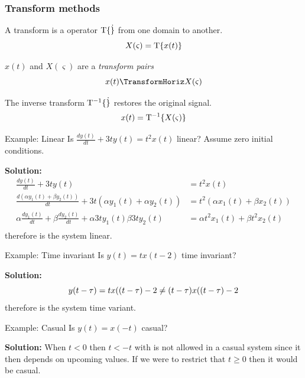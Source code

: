 \documentclass{article}
\begin{document}
\subsubsection{Transform methods}
A transform is a operator $\mathrm{T}\{ \dot \}$ from one domain to another.
\begin{equation*}
    X(\varsigma) = \mathrm{T}\{ x(t) \}
\end{equation*}

$x(t)$ and $X(\varsigma)$ are a \textit{transform pairs}
\begin{equation*}
    x(t) \TransformHoriz X(\varsigma)
\end{equation*}

The inverse transform $\mathrm{T}^{-1}\{ \dot \}$ restores the original signal.
\begin{equation*}
    x(t) = \mathrm{T}^{-1}\{ X(\varsigma) \}
\end{equation*}

\begin{exampleblock}{Example: Linear}
Is $\frac{dy(t)}{dt}+3ty(t)=t^2x(t)$ linear? Assume zero initial conditions.

\textbf{Solution:}
\begin{align*}
    \frac{dy(t)}{dt}+3ty(t) &= t^2x(t) \\
    \frac{d(\alpha y_1(t) + \beta y_2(t))}{dt} + 3t(\alpha y_1(t) + \alpha y_2(t)) &= t^2(\alpha x_1(t) + \beta x_2(t)) \\
    \alpha\frac{dy_1(t)}{dt} + \beta\frac{dy_2(t)}{dt} + \alpha 3ty_1(t) \beta 3ty_2(t) &= \alpha t^2 x_1(t) + \beta t^2 x_2(t) \\
\end{align*}
therefore is the system linear.
\end{exampleblock}


\begin{exampleblock}{Example: Time invariant}
Is $y(t)=tx(t-2)$ time invariant? 

\textbf{Solution:}
\begin{equation*}
    y(t-\tau) = tx((t-\tau)-2 \neq (t-\tau)x((t-\tau)-2 \\
\end{equation*}
therefore is the system time variant.
\end{exampleblock}

\vspace{1cm}
\begin{exampleblock}{Example: Casual}
Is $y(t)=x(-t)$ casual? 

\textbf{Solution:}
When $t<0$ then $t<-t$ with is not allowed in a casual system since it then depends on
upcoming values. If we were to restrict that $t\geq0$ then it would be casual.
\end{exampleblock}
\end{document}
